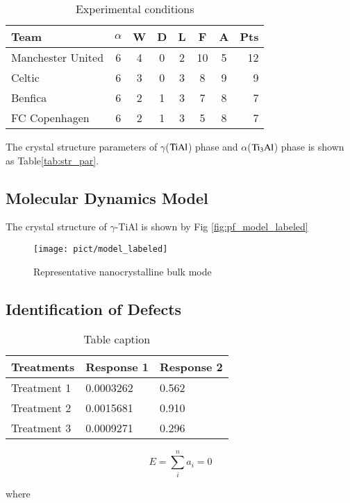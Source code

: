 \documentclass[final,5p,times,twocolumn]{elsarticle}
\begin{document}
\begin{table}[H]
\centering
\caption{Experimental conditions}
\begin{tabular}{l*{6}{c}r}	
		\hline
		Team              & $\alpha$ & W & D & L & F  & A & Pts \\
		\hline
		Manchester United & 6 & 4 & 0 & 2 & 10 & 5 & 12  \\
		Celtic            & 6 & 3 & 0 & 3 &  8 & 9 &  9  \\
		Benfica           & 6 & 2 & 1 & 3 &  7 & 8 &  7  \\
		FC Copenhagen     & 6 & 2 & 1 & 3 &  5 & 8 &  7  \\
		\hline
\end{tabular}
\label{Tab:par}
\end{table}


The crystal structure parameters of $\gamma$($\rm TiAl$) phase and $\alpha$($\rm Ti_3Al$) phase is shown as Table\ref{tab:str_par}. 
\subsection{Molecular Dynamics Model}
The crystal structure of $\gamma$-TiAl
is shown by Fig \ref{fig:pf_model_labeled}

\begin{figure}
	\centering
	\texttt{[image: pict/model\_labeled]}
	\caption{Representative nanocrystalline bulk mode}
	\centering
	\label{fig:pf_model}
\end{figure}
\subsection{Identification of Defects}

 \begin{table}[h]
 	\centering
 	\caption{Table caption}
 	\begin{tabular}{l l l}
 		\hline
 		\textbf{Treatments} & \textbf{Response 1} & \textbf{Response 2}\\
 		\hline
 		Treatment 1 & 0.0003262 & 0.562 \\
 		Treatment 2 & 0.0015681 & 0.910 \\
 		Treatment 3 & 0.0009271 & 0.296 \\
 		\hline
 	\end{tabular}
 	
 \end{table}


$$E=\sum_{i}^n a_i=0$$

where
\end{document}
